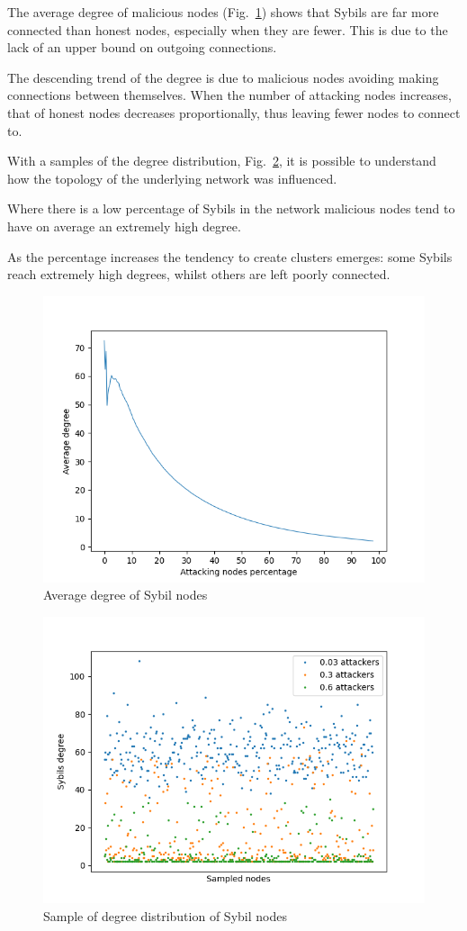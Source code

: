 The average degree of malicious nodes (Fig.~\ref{fig:in-atk-degree}) shows that Sybils are far more connected than honest nodes, especially when they are fewer. This is due to the lack of an upper bound on outgoing connections.

The descending trend of the degree is due to malicious nodes avoiding making connections between themselves. When the number of attacking nodes increases, that of honest nodes decreases proportionally, thus leaving fewer nodes to connect to.

With a samples of the degree distribution, Fig.~\ref{fig:incluster}, it is possible to understand how the topology of the underlying network was influenced. 

Where there is a low percentage of Sybils in the network malicious nodes tend to have on average an extremely high degree.

As the percentage increases the tendency to create clusters emerges: some Sybils reach extremely high degrees, whilst others are left poorly connected.\par
\begin{figure}[h!]
	\includegraphics[width=.7\textwidth]{pict/results/in-atk-avg-degree.png}
	\centering
	\caption{Average degree of Sybil nodes}
	\label{fig:in-atk-degree}
\end{figure}

\begin{figure}[h!]
	\includegraphics[width=.8\textwidth]{pict/results/in-cluster.png}
	\centering
	\caption{Sample of degree distribution of Sybil nodes}
	\label{fig:incluster}
\end{figure}

